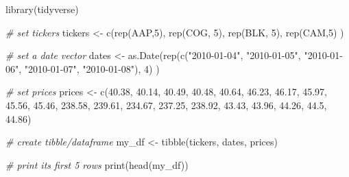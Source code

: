 \documentclass[
  12pt,
]{book}
\newenvironment{Shaded}{\begin{snugshade}}{\end{snugshade}}
\newcommand{\CommentTok}[1]{\textcolor[rgb]{0.37,0.37,0.37}{\textit{#1}}}
\newcommand{\DecValTok}[1]{\textcolor[rgb]{0.06,0.06,0.06}{#1}}
\newcommand{\FloatTok}[1]{\textcolor[rgb]{0.06,0.06,0.06}{#1}}
\newcommand{\FunctionTok}[1]{\textcolor[rgb]{0,0,0}{#1}}
\newcommand{\NormalTok}[1]{#1}
\newcommand{\OtherTok}[1]{\textcolor[rgb]{0.37,0.37,0.37}{#1}}
\newcommand{\StringTok}[1]{\textcolor[rgb]{0.5,0.5,0.5}{#1}}
\begin{document}
\begin{Shaded}
\begin{Highlighting}[]
\FunctionTok{library}\NormalTok{(tidyverse)}

\CommentTok{\# set tickers}
\NormalTok{tickers }\OtherTok{\textless{}{-}} \FunctionTok{c}\NormalTok{(}\FunctionTok{rep}\NormalTok{(}\StringTok{\textquotesingle{}AAP\textquotesingle{}}\NormalTok{,}\DecValTok{5}\NormalTok{), }
             \FunctionTok{rep}\NormalTok{(}\StringTok{\textquotesingle{}COG\textquotesingle{}}\NormalTok{, }\DecValTok{5}\NormalTok{), }
             \FunctionTok{rep}\NormalTok{(}\StringTok{\textquotesingle{}BLK\textquotesingle{}}\NormalTok{, }\DecValTok{5}\NormalTok{), }
             \FunctionTok{rep}\NormalTok{(}\StringTok{\textquotesingle{}CAM\textquotesingle{}}\NormalTok{,}\DecValTok{5}\NormalTok{) )}

\CommentTok{\# set a date vector}
\NormalTok{dates }\OtherTok{\textless{}{-}} \FunctionTok{as.Date}\NormalTok{(}\FunctionTok{rep}\NormalTok{(}\FunctionTok{c}\NormalTok{(}\StringTok{"2010{-}01{-}04"}\NormalTok{, }\StringTok{"2010{-}01{-}05"}\NormalTok{, }\StringTok{"2010{-}01{-}06"}\NormalTok{, }
                       \StringTok{"2010{-}01{-}07"}\NormalTok{, }\StringTok{"2010{-}01{-}08"}\NormalTok{), }\DecValTok{4}\NormalTok{) )}

\CommentTok{\# set prices                      }
\NormalTok{prices }\OtherTok{\textless{}{-}} \FunctionTok{c}\NormalTok{(}\FloatTok{40.38}\NormalTok{,  }\FloatTok{40.14}\NormalTok{,  }\FloatTok{40.49}\NormalTok{,  }\FloatTok{40.48}\NormalTok{,  }\FloatTok{40.64}\NormalTok{,}
            \FloatTok{46.23}\NormalTok{,  }\FloatTok{46.17}\NormalTok{,  }\FloatTok{45.97}\NormalTok{,  }\FloatTok{45.56}\NormalTok{,  }\FloatTok{45.46}\NormalTok{,}
            \FloatTok{238.58}\NormalTok{, }\FloatTok{239.61}\NormalTok{, }\FloatTok{234.67}\NormalTok{, }\FloatTok{237.25}\NormalTok{, }\FloatTok{238.92}\NormalTok{,}
            \FloatTok{43.43}\NormalTok{,  }\FloatTok{43.96}\NormalTok{,  }\FloatTok{44.26}\NormalTok{,  }\FloatTok{44.5}\NormalTok{,   }\FloatTok{44.86}\NormalTok{)}

\CommentTok{\# create tibble/dataframe}
\NormalTok{my\_df }\OtherTok{\textless{}{-}} \FunctionTok{tibble}\NormalTok{(tickers, dates, prices)}

\CommentTok{\# print its first 5 rows}
\FunctionTok{print}\NormalTok{(}\FunctionTok{head}\NormalTok{(my\_df))}
\end{Highlighting}
\end{Shaded}
\end{document}
